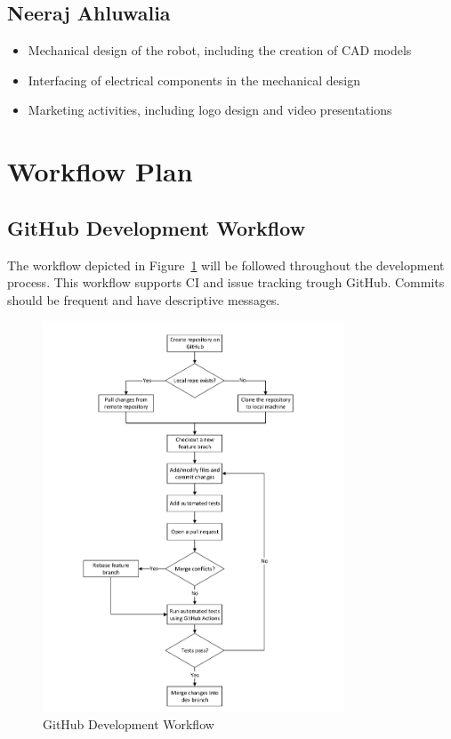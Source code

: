 \documentclass[titlepage]{article}
\begin{document}
\subsection{Neeraj Ahluwalia}
\begin{itemize}
\item Mechanical design of the robot, including the creation of CAD models
\item Interfacing of electrical components in the mechanical design
\item Marketing activities, including logo design and video presentations
\end{itemize}

\section{Workflow Plan}

\subsection{GitHub Development Workflow}

The workflow depicted in Figure~\ref{fig:Workflow} will be followed throughout the development process. This workflow supports CI and issue tracking trough GitHub. Commits should be frequent and have descriptive messages.

\begin{figure} [H]
\begin{center}
	\includegraphics [width=0.8\textwidth] {Figures/GitHub Workflow.pdf}
	\caption{GitHub Development Workflow}
	\label{fig:Workflow}
	\end{center}
\end{figure}
\end{document}
